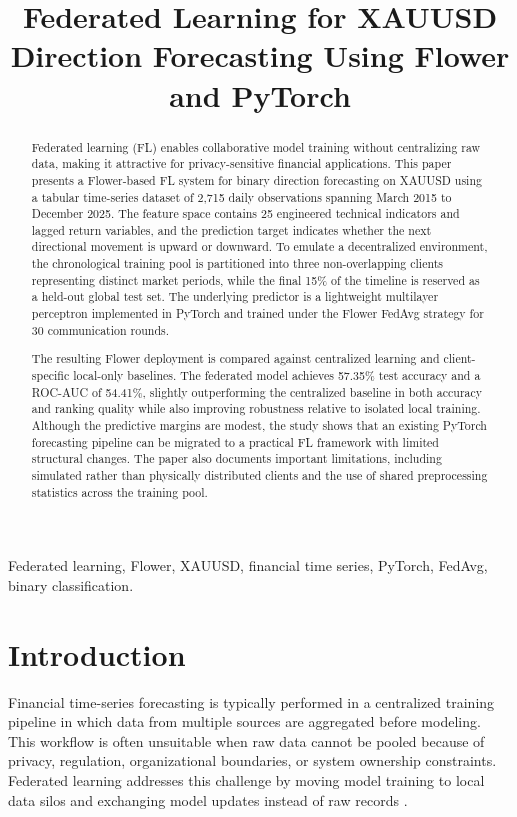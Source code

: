 \documentclass[conference]{IEEEtran}
\title{Federated Learning for XAUUSD Direction Forecasting Using Flower and PyTorch}
\author{
\IEEEauthorblockN{CSE711 Project Team}
\IEEEauthorblockA{
Department of Computer Science and Engineering\\
University Project Report\\
Replace this line with author names, student IDs, and institutional email addresses before submission
}
}
\begin{document}
\maketitle

\begin{abstract}
Federated learning (FL) enables collaborative model training without centralizing raw data, making it attractive for privacy-sensitive financial applications. This paper presents a Flower-based FL system for binary direction forecasting on XAUUSD using a tabular time-series dataset of 2,715 daily observations spanning March 2015 to December 2025. The feature space contains 25 engineered technical indicators and lagged return variables, and the prediction target indicates whether the next directional movement is upward or downward. To emulate a decentralized environment, the chronological training pool is partitioned into three non-overlapping clients representing distinct market periods, while the final 15\% of the timeline is reserved as a held-out global test set. The underlying predictor is a lightweight multilayer perceptron implemented in PyTorch and trained under the Flower FedAvg strategy for 30 communication rounds.

The resulting Flower deployment is compared against centralized learning and client-specific local-only baselines. The federated model achieves 57.35\% test accuracy and a ROC-AUC of 54.41\%, slightly outperforming the centralized baseline in both accuracy and ranking quality while also improving robustness relative to isolated local training. Although the predictive margins are modest, the study shows that an existing PyTorch forecasting pipeline can be migrated to a practical FL framework with limited structural changes. The paper also documents important limitations, including simulated rather than physically distributed clients and the use of shared preprocessing statistics across the training pool.
\end{abstract}

\begin{IEEEkeywords}
Federated learning, Flower, XAUUSD, financial time series, PyTorch, FedAvg, binary classification.
\end{IEEEkeywords}

\section{Introduction}
Financial time-series forecasting is typically performed in a centralized training pipeline in which data from multiple sources are aggregated before modeling. This workflow is often unsuitable when raw data cannot be pooled because of privacy, regulation, organizational boundaries, or system ownership constraints. Federated learning addresses this challenge by moving model training to local data silos and exchanging model updates instead of raw records \cite{mcmahan2017,kairouz2021}.
\end{document}
